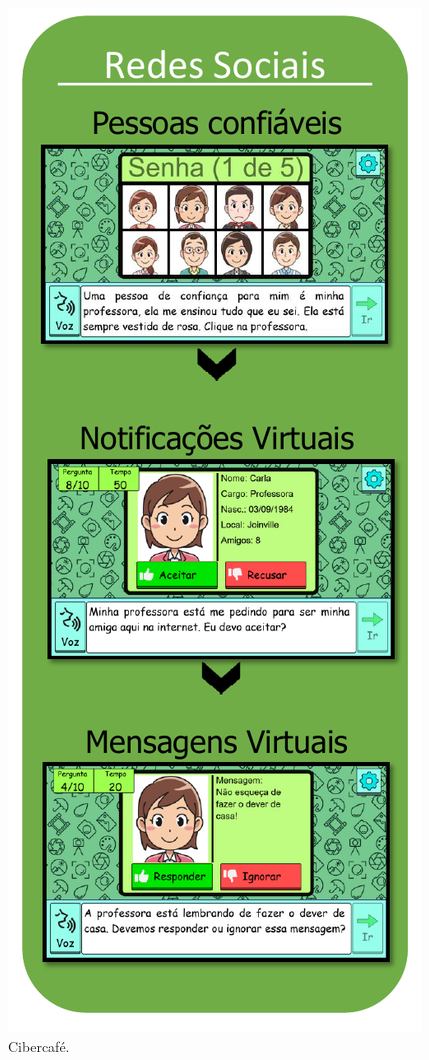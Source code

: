 \begin{figure}%
  \vspace{-20pt}
  \caption{\label{fig:Cibercafe}Cibercafé.}
  \includegraphics[width=\linewidth]{./Visuais/Cibercafe2.pdf}
  \vspace{-1.0cm}
\end{figure}

